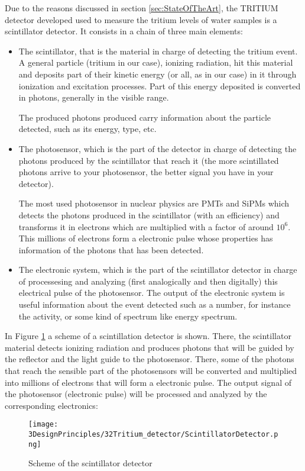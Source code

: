 Due to the reasons discussed in section \ref{sec:StateOfTheArt}, the TRITIUM detector developed used to measure the tritium levels of water samples is a scintillator detector. It consists in a chain of three main elements:

\begin{itemize}

\item{} The scintillator, that is the material in charge of detecting the tritium event. A general particle (tritium in our case), ionizing radiation, hit this material and deposits part of their kinetic energy (or all, as in our case) in it through ionization and excitation processes. Part of this energy deposited is converted in photons, generally in the visible range.

The produced photons produced carry information about the particle detected, such as its energy, type, etc.

\item{} The photosensor, which is the part of the detector in charge of detecting the photons produced by the scintillator that reach it (the more scintillated photons arrive to your photosensor, the better signal you have in your detector). 

The most used photosensor in nuclear physics are PMTs and SiPMs which detects the photons produced in the scintillator (with an efficiency) and transforms it in electrons which are multiplied with a factor of around $10^6$. This millions of electrons form a electronic pulse whose properties has information of the photons that has been detected.

\item{} The electronic system, which is the part of the scintillator detector in charge of processesing and analyzing (first analogically and then digitally) this electrical pulse of the photosensor. The output of the electronic system is useful information about the event detected such as a number, for instance the activity, or some kind of spectrum like energy spectrum.

\end{itemize}

In Figure \ref{fig:ScintillatorDetector} a scheme of a scintillation detector is shown. There, the scintillator material detects ionizing radiation and produces photons that will be guided by the reflector and the light guide to the photosensor. There, some of the photons that reach the sensible part of the photosensors will be converted and multiplied into millions of electrons that will form a electronic pulse. The output signal of the photosensor (electronic pulse) will be processed and analyzed by the corresponding electronics:

\begin{figure}[hbtp]
\texttt{[image: 3DesignPrinciples/32Tritium\_detector/ScintillatorDetector.png]}
\centering
\caption{Scheme of the scintillator detector\label{fig:ScintillatorDetector}}
\end{figure}
